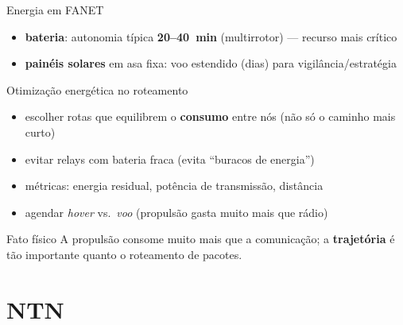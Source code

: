 \documentclass[aspectratio=169,11pt]{beamer}
\begin{document}
\begin{frame}{Energia em FANET}
  \begin{itemize}
    \item \textbf{bateria}: autonomia típica \textbf{20--40~min} (multirrotor) --- recurso mais crítico
    \item \textbf{painéis solares} em asa fixa: voo estendido (dias) para vigilância/estratégia
  \end{itemize}
  \begin{block}{Otimização energética no roteamento}
    \begin{itemize}
      \item escolher rotas que equilibrem o \textbf{consumo} entre nós (não só o caminho mais curto)
      \item evitar relays com bateria fraca (evita ``buracos de energia'')
      \item métricas: energia residual, potência de transmissão, distância
      \item agendar \emph{hover} vs.\ \emph{voo} (propulsão gasta muito mais que rádio)
    \end{itemize}
  \end{block}
  \begin{exampleblock}{Fato físico}
    A propulsão consome muito mais que a comunicação; a \textbf{trajetória} é tão importante quanto o roteamento de pacotes.
  \end{exampleblock}
\end{frame}

\section{NTN}
\end{document}
